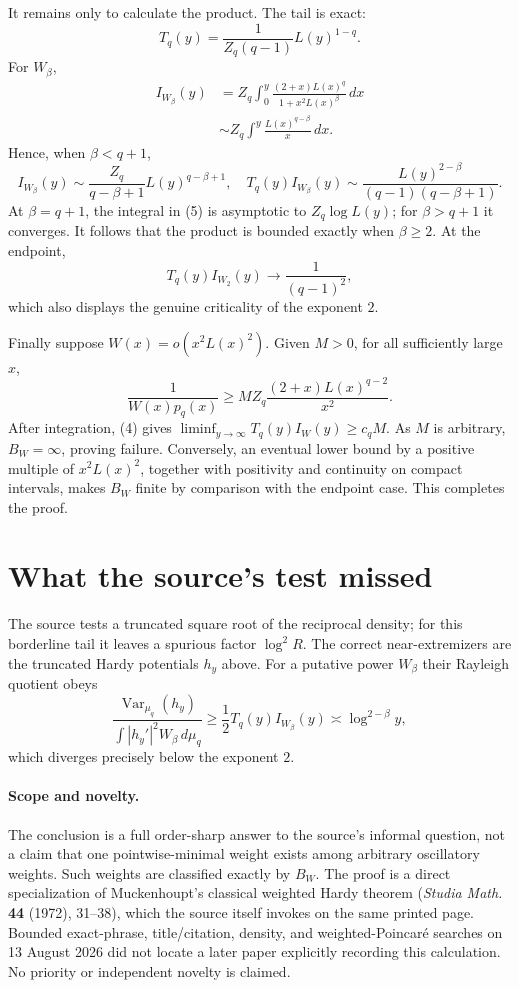 \documentclass[10pt]{article}
\newcommand{\Var}{\operatorname{Var}}
\begin{document}
It remains only to calculate the product.  The tail is exact:
\begin{equation}
 T_q(y)=\frac{1}{Z_q(q-1)}L(y)^{1-q}.                       \tag{4}
\end{equation}
For $W_\beta$,
\begin{align*}
 I_{W_\beta}(y)
 &=Z_q\int_0^y
   \frac{(2+x)L(x)^q}{1+x^2L(x)^\beta}\,dx\\
 &\sim Z_q\int^y\frac{L(x)^{q-\beta}}{x}\,dx.
                                                                    \tag{5}
\end{align*}
Hence, when $\beta<q+1$,
\begin{equation}
 I_{W_\beta}(y)\sim
 \frac{Z_q}{q-\beta+1}L(y)^{q-\beta+1},
\quad
 T_q(y)I_{W_\beta}(y)\sim
 \frac{L(y)^{2-\beta}}{(q-1)(q-\beta+1)}.                 \tag{6}
\end{equation}
At $\beta=q+1$, the integral in (5) is asymptotic to
$Z_q\log L(y)$; for $\beta>q+1$ it converges.  It follows that the product
is bounded exactly when $\beta\ge2$.  At the endpoint,
\[
 T_q(y)I_{W_2}(y)\longrightarrow\frac{1}{(q-1)^2},          \tag{7}
\]
which also displays the genuine criticality of the exponent $2$.

Finally suppose $W(x)=o(x^2L(x)^2)$.  Given $M>0$, for all sufficiently
large $x$,
\[
 \frac{1}{W(x)p_q(x)}
 \ge M Z_q\frac{(2+x)L(x)^{q-2}}{x^2}.
\]
After integration, (4) gives
$\liminf_{y\to\infty}T_q(y)I_W(y)\ge c_qM$.
As $M$ is arbitrary, $B_W=\infty$, proving failure.  Conversely, an eventual
lower bound by a positive multiple of $x^2L(x)^2$, together with positivity
and continuity on compact intervals, makes $B_W$ finite by comparison with
the endpoint case.  This completes the proof.

\section{What the source's test missed}
The source tests a truncated square root of the reciprocal density; for this
borderline tail it leaves a spurious factor $\log^2R$.  The correct
near-extremizers are the truncated Hardy potentials $h_y$ above.  For a
putative power $W_\beta$ their Rayleigh quotient obeys
\[
 \frac{\Var_{\mu_q}(h_y)}
      {\int |h_y'|^2W_\beta\,d\mu_q}
 \ge\frac12T_q(y)I_{W_\beta}(y)
 \asymp \log^{2-\beta}y,
\]
which diverges precisely below the exponent $2$.

\paragraph{Scope and novelty.}
The conclusion is a full order-sharp answer to the source's informal
question, not a claim that one pointwise-minimal weight exists among arbitrary
oscillatory weights.  Such weights are classified exactly by $B_W$.
The proof is a direct specialization of Muckenhoupt's classical weighted
Hardy theorem (\emph{Studia Math.} \textbf{44} (1972), 31--38), which the
source itself invokes on the same printed page.  Bounded exact-phrase,
title/citation, density, and weighted-Poincar\'e
searches on 13 August 2026 did not locate a later paper explicitly recording
this calculation.  No priority or independent novelty is claimed.
\end{document}
